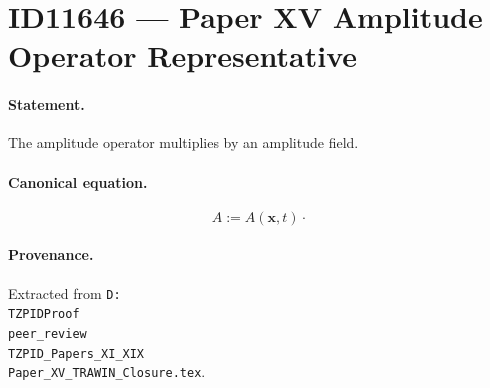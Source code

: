 \section*{ID11646 --- Paper XV Amplitude Operator Representative}

\paragraph{Statement.}
The amplitude operator multiplies by an amplitude field.

\paragraph{Canonical equation.}
\[
A:=A(\mathbf{x},t)\cdot
\]

\paragraph{Provenance.}
Extracted from \texttt{D:\\TZPIDProof\\peer\_review\\TZPID\_Papers\_XI\_XIX\\Paper\_XV\_TRAWIN\_Closure.tex}.
